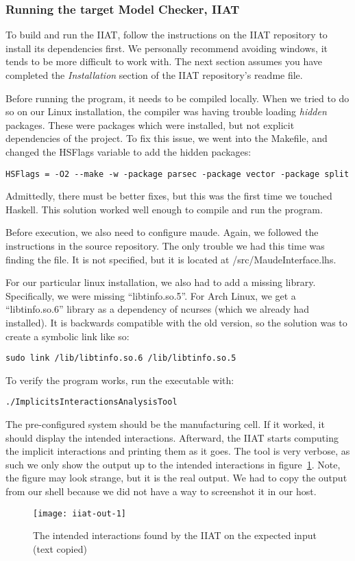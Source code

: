     \subsubsection{Running the target Model Checker, IIAT}\label{subsubsec:iiat-run}
    To build and run the IIAT, follow the instructions on the IIAT repository to install its dependencies first. %
    We personally recommend avoiding windows, it tends to be more difficult to work with.
    The next section assumes you have completed the \textit{Installation} section of the IIAT repository's readme file.

    Before running the program, it needs to be compiled locally.
    When we tried to do so on our Linux installation, the compiler was having trouble loading \textit{hidden} packages.
    These were packages which were installed, but not explicit dependencies of the project.
    To fix this issue, we went into the Makefile, and changed the HSFlags variable to add the hidden packages:
    \begin{verbatim}HSFlags = -O2 --make -w -package parsec -package vector -package split\end{verbatim}
    Admittedly, there must be better fixes, but this was the first time we touched Haskell.
    This solution worked well enough to compile and run the program.

    Before execution, we also need to configure maude.
    Again, we followed the instructions in the source repository.
    The only trouble we had this time was finding the file.
    It is not specified, but it is located at /src/MaudeInterface.lhs.

    For our particular linux installation, we also had to add a missing library.
    Specifically, we were missing ``libtinfo.so.5''.
    For Arch Linux, we get a ``libtinfo.so.6'' library as a dependency of ncurses (which we already had installed).
    It is backwards compatible with the old version, so the solution was to create a symbolic link like so:
    \begin{verbatim}sudo link /lib/libtinfo.so.6 /lib/libtinfo.so.5\end{verbatim}

    To verify the program works, run the executable with:
    \begin{verbatim}./ImplicitsInteractionsAnalysisTool\end{verbatim}
    The pre-configured system should be the manufacturing cell.
    If it worked, it should display the intended interactions.
    Afterward, the IIAT starts computing the implicit interactions and printing them as it goes.
    The tool is very verbose, as such we only show the output up to the intended interactions in figure~\ref{fig:iiat-out}.
    Note, the figure may look strange, but it is the real output.
    We had to copy the output from our shell because we did not have a way to screenshot it in our host.
    \begin{figure}[h]
        \centering
        \texttt{[image: iiat-out-1]}
        \caption{The intended interactions found by the IIAT on the expected input (text copied)}
        \label{fig:iiat-out}
    \end{figure}

